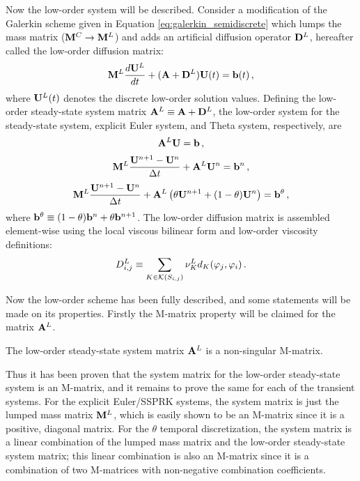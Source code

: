 Now the low-order system will be described.
Consider a modification of the Galerkin scheme given in Equation \eqref{eq:galerkin_semidiscrete}
which lumps the mass matrix ($\mathbf{M}^C \rightarrow \mathbf{M}^L$) and adds an artificial
diffusion operator $\mathbf{D}^L$, hereafter called the low-order diffusion matrix:
\begin{equation}
  \mathbf{M}^L\frac{d\mathbf{U}^L}{dt} + (\mathbf{A} + \mathbf{D}^L)\mathbf{U}(t) = \mathbf{b}(t) \,,
\end{equation}
where $\mathbf{U}^L(t)$ denotes the discrete low-order solution values.
Defining the low-order steady-state system matrix $\mathbf{A}^L\equiv\mathbf{A} + \mathbf{D}^L$,
the low-order system for the steady-state system, explicit Euler system,
and Theta system, respectively, are
\begin{equation}\label{eq:low_ss}
  \mathbf{A}^L \mathbf{U} = \mathbf{b} \,,
\end{equation}
\begin{equation}\label{eq:low_fe}
  \mathbf{M}^L\frac{\mathbf{U}^{n+1} - \mathbf{U}^n}{\Delta t} + \mathbf{A}^L\mathbf{U}^n = \mathbf{b}^n \,,
\end{equation}
\begin{equation}\label{eq:low_theta}
  \mathbf{M}^L\frac{\mathbf{U}^{n+1} - \mathbf{U}^n}{\Delta t} + \mathbf{A}^L\left(\theta\mathbf{U}^{n+1} + (1-\theta)\mathbf{U}^n\right)
    = \mathbf{b}^\theta \,,
\end{equation}
where $\mathbf{b}^\theta \equiv (1-\theta)\mathbf{b}^n + \theta\mathbf{b}^{n+1}$.
The low-order
diffusion matrix is assembled element-wise using the local viscous bilinear
form and low-order viscosity definitions:
\begin{equation}\label{eq:low_order_diffusion_matrix}
  D_{i,j}^L \equiv
    \sum\limits_{K\in \mathcal{K}(S_{i,j})}\nu^L_K
    d_K(\varphi_j,\varphi_i) \,.
\end{equation}

Now the low-order scheme has been fully described, and some statements will be
made on its properties. Firstly the M-matrix property will be claimed for
the matrix $\mathbf{A}^L$.
\begin{thm}
  The low-order steady-state system matrix $\mathbf{A}^L$ is a non-singular M-matrix.
\end{thm}

Thus it has been proven that the system matrix for the low-order steady-state
system is an M-matrix, and it remains to prove the same for each of the
transient systems. For the explicit Euler/SSPRK systems, the system matrix
is just the lumped mass matrix $\mathbf{M}^L$, which is easily shown to be an M-matrix
since it is a positive, diagonal matrix. For the $\theta$ temporal
discretization, the system matrix is a linear combination of the lumped mass
matrix and the low-order steady-state system matrix; this linear combination
is also an M-matrix since it is a combination of two M-matrices with non-negative
combination coefficients.

